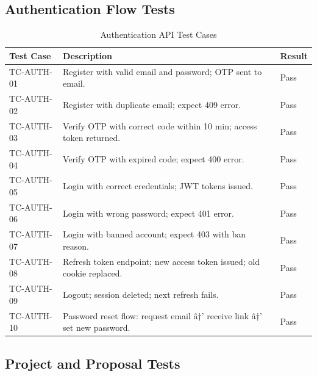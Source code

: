 \subsection{Authentication Flow Tests}

\begin{table}[H]
\centering
\caption{Authentication API Test Cases}
\begin{tabularx}{\textwidth}{lXl}
\toprule
\textbf{Test Case} & \textbf{Description} & \textbf{Result} \\
\midrule
TC-AUTH-01 & Register with valid email and password; OTP sent to email.           & Pass \\
TC-AUTH-02 & Register with duplicate email; expect 409 error.                    & Pass \\
TC-AUTH-03 & Verify OTP with correct code within 10 min; access token returned.  & Pass \\
TC-AUTH-04 & Verify OTP with expired code; expect 400 error.                     & Pass \\
TC-AUTH-05 & Login with correct credentials; JWT tokens issued.                  & Pass \\
TC-AUTH-06 & Login with wrong password; expect 401 error.                        & Pass \\
TC-AUTH-07 & Login with banned account; expect 403 with ban reason.              & Pass \\
TC-AUTH-08 & Refresh token endpoint; new access token issued; old cookie replaced. & Pass \\
TC-AUTH-09 & Logout; session deleted; next refresh fails.                        & Pass \\
TC-AUTH-10 & Password reset flow: request email â†’ receive link â†’ set new password. & Pass \\
\bottomrule
\end{tabularx}
\end{table}

\subsection{Project and Proposal Tests}

